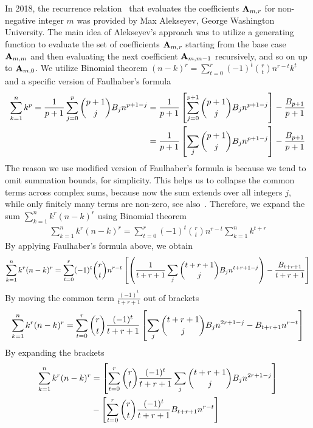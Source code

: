 In 2018, the recurrence relation~\cite{alekseyev2018mathoverflow} that evaluates the coefficients ${\mathbf{A}} \sb{m,r}$ for
non-negative integer $m$ was provided by Max Alekseyev, George Washington University.
The main idea of Alekseyev's approach was to utilize a generating function to evaluate the set of coefficients ${\mathbf{A}} \sb{m,r}$
starting from the base case ${\mathbf{A}} \sb{m,m}$ and then evaluating the next coefficient ${\mathbf{A}} \sb{m,m-1}$
recursively, and so on up to ${\mathbf{A}} \sb{m,0}$.
We utilize Binomial theorem $(n-k)^r=\sum_{t=0}^{r} (-1)^t \binom{r}{t} n^{r-t} k^t$ and a specific version
of Faulhaber's formula~\cite{beardon1996sums}
\begin{align*}
    \sum_{k=1}^{n} k^{p}
    = \frac{1}{p+1}\sum_{j=0}^{p} \binom{p+1}{j} {B}\sb{j} n^{p+1-j}
    &= \frac{1}{p+1} \left[ \sum_{j=0}^{p+1} \binom{p+1}{j} {B}\sb{j} n^{p+1-j} \right] - \frac{{B}\sb{p+1}}{p+1} \\
    &= \frac{1}{p+1} \left[ \sum_{j} \binom{p+1}{j} {B}\sb{j} n^{p+1-j} \right] - \frac{{B}\sb{p+1}}{p+1}
\end{align*}
The reason we use modified version of Faulhaber's formula is because we tend to omit summation bounds, for simplicity.
This helps us to collapse the common terms across complex sums, because now the sum extends over all integers $j$,
while only finitely many terms are non-zero, see also~\cite[~p. 2]{knuth1992two}.
Therefore, we expand the sum $\sum_{k=1}^{n} k^{r} (n-k)^{r}$ using Binomial theorem
\begin{align*}
    \sum_{k=1}^{n} k^{r} (n-k)^{r} = \sum_{t=0}^{r} (-1)^t \binom{r}{t} n^{r-t} \sum_{k=1}^{n} k^{t+r}
\end{align*}
By applying Faulhaber's formula above, we obtain
\begin{align*}
    \sum_{k=1}^{n} k^{r} (n-k)^{r}
    = \sum_{t=0}^{r} (-1)^t \binom{r}{t} n^{r-t} \left[ \left( \frac{1}{t+r+1} \sum_{j} \binom{t+r+1}{j} {B}\sb{j} n^{t+r+1-j} \right) - \frac{{B}\sb{t+r+1}}{t+r+1} \right]
\end{align*}
By moving the common term $\frac{(-1)^t}{t+r+1}$ out of brackets
\begin{align*}
    \sum_{k=1}^{n} k^{r} (n-k)^{r}
    = \sum_{t=0}^{r} \binom{r}{t} \frac{(-1)^t}{t+r+1} \left[ \sum_{j} \binom{t+r+1}{j} {B}\sb{j} n^{2r+1-j} - {B}\sb{t+r+1} n^{r-t} \right]
\end{align*}
By expanding the brackets
\begin{align*}
    \sum_{k=1}^{n} k^{r} (n-k)^{r}
    &= \left[ \sum_{t=0}^{r} \binom{r}{t} \frac{(-1)^t}{t+r+1} \sum_{j} \binom{t+r+1}{j} {B}\sb{j} n^{2r+1-j}  \right] \\
    &- \left[ \sum_{t=0}^{r} \binom{r}{t} \frac{(-1)^t}{t+r+1} {B}\sb{t+r+1} n^{r-t} \right]
\end{align*}
